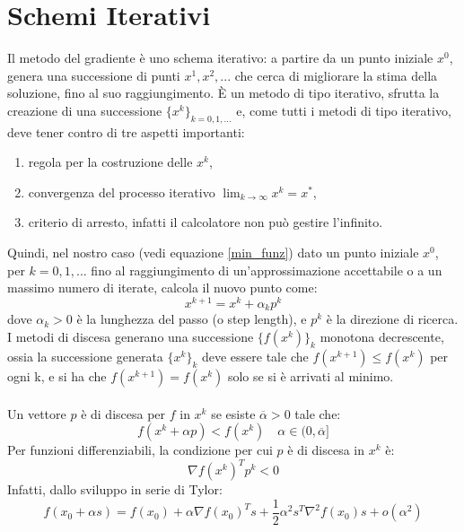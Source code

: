 \documentclass{report}
\begin{document}
\section{Schemi Iterativi}
Il metodo del gradiente è uno schema iterativo: a partire da un punto iniziale $x^0$, genera una successione di punti $x^1, x^2, ...$ che cerca di migliorare la stima della soluzione, fino al suo raggiungimento. \`E un metodo di tipo iterativo, sfrutta la creazione di una successione $\{x^k\}_{k=0,1,...}$ e, come tutti i metodi di tipo iterativo, deve tener contro di tre aspetti importanti:
\begin{enumerate}
  \item regola per la costruzione delle $x^k$,
  \item convergenza del processo iterativo $\lim_{k \to \infty}x^k = x^*$,
  \item criterio di arresto, infatti il calcolatore non può gestire l'infinito.
\end{enumerate}
Quindi, nel nostro caso (vedi equazione \eqref{min_funz}) dato un punto iniziale $x^0$, per $k=0,1,...$ fino al raggiungimento di un'approssimazione accettabile o a un massimo numero di iterate, calcola il nuovo punto come:
\begin{equation}
    \label{passo_x_k}
    x^{k+1} = x^k + \alpha_k p^k
\end{equation}
dove $\alpha_k > 0$ è la lunghezza del passo (o step length), e $p^k$ è la direzione di ricerca.\\
I metodi di discesa generano una successione $\{f(x^k)\}_k$ monotona decrescente, ossia la successione generata $\{x^k\}_k$ deve essere tale che $f(x^{k+1}) \leqslant f(x^{k})$ per ogni k, e si ha che $f(x^{k+1})=f(x^{k})$ solo se si è arrivati al minimo.
\\
\\
Un vettore $p$ è di discesa per $f$ in $x^k$ se esiste $\overline{\alpha} > 0$ tale che:
\begin{equation}
    \label{vett_discesa}
     f(x^k + \alpha p) < f(x^k ) \quad \alpha \in (0, \overline{\alpha}]
\end{equation}
Per funzioni differenziabili, la condizione per cui $p$ è di discesa in $x^k$ è:
\begin{equation}
    \label{condizione_p_discesa}
     \nabla f(x^k)^T p^k < 0
\end{equation}
Infatti, dallo sviluppo in serie di Tylor:
\begin{equation}
    \label{sviluppo_tylor}
     f(x_0 + \alpha s) = f(x_0) +\alpha\nabla  f(x_0)^T s + \frac{1}{2}\alpha^2 s^T\nabla^2  f(x_0) s + o(\alpha^2)
\end{equation}
\end{document}
